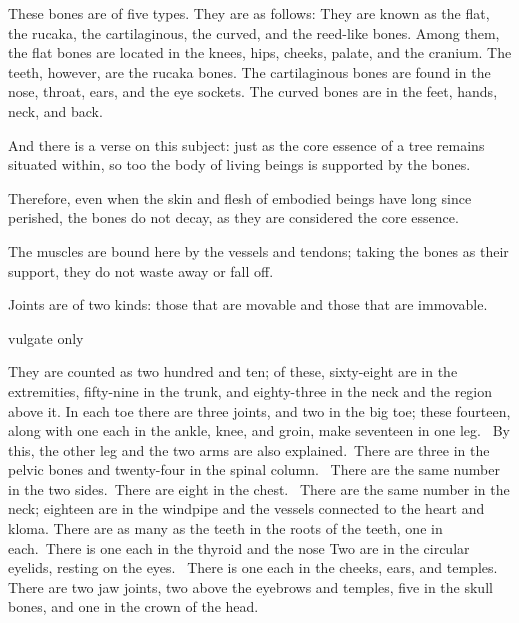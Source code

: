 \begin{translation}
\begin{tt}
\item[20]
These bones are of five types. They are as follows: They are known as the flat, the rucaka, the cartilaginous, the curved, and the reed-like bones. Among them, the flat bones are located in the knees, hips, cheeks, palate, and the cranium.  The teeth, however, are the rucaka bones. The cartilaginous bones are found in the nose, throat, ears, and the eye sockets. The curved bones are in the feet, hands, neck, and back. 

\item[21]
And there is a verse on this subject: just as the core essence of a tree remains situated within, so too the body of living beings is supported by the bones. 

\item[22]
Therefore, even when the skin and flesh of embodied beings have long since perished, the bones do not decay, as they are considered the core essence. 

\item[23]
The muscles are bound here by the vessels and tendons; taking the bones as their support, they do not waste away or fall off. 

\item[24]
Joints are of two kinds: those that are movable and those that are immovable. 
\item[25]   vulgate only

\item[26]
They are counted as two hundred and ten; of these, sixty-eight are in the extremities, fifty-nine in the trunk, and eighty-three in the neck and the region above it. In each toe there are three joints, and two in the big toe; these fourteen, along with one each in the ankle, knee, and groin, make seventeen in one leg.  By this, the other leg and the two arms are also explained. There are three in the pelvic bones and twenty-four in the spinal column.  There are the same number in the two sides. There are eight in the chest.  There are the same number in the neck; eighteen are in the windpipe and the vessels connected to the heart and kloma. There are as many as the teeth in the roots of the teeth, one in each. There is one each in the thyroid and the nose Two are in the circular eyelids, resting on the eyes. 
There is one each in the cheeks, ears, and temples.  There are two jaw joints, two above the eyebrows and temples, five in the skull bones, and one in the crown of the head. 


\end{tt}
\end{translation}
